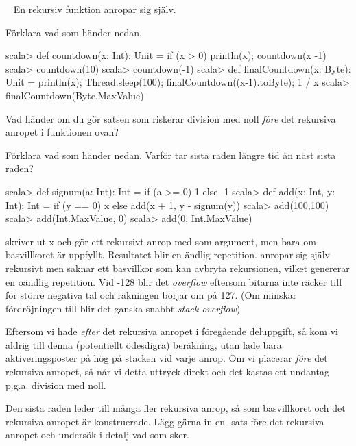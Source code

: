 \QUESTEND





\QUESTBEGIN

\Task\Uberkurs  \what~  En rekursiv funktion anropar sig själv.

\Subtask Förklara vad som händer nedan.

\begin{REPL}
scala> def countdown(x: Int): Unit = if (x > 0) {println(x); countdown(x -1)}
scala> countdown(10)
scala> countdown(-1)
scala> def finalCountdown(x: Byte): Unit =
         {println(x); Thread.sleep(100); finalCountdown((x-1).toByte); 1 / x}
scala> finalCountdown(Byte.MaxValue)
\end{REPL}

\Subtask Vad händer om du gör satsen som riskerar division med noll \emph{före} det rekursiva anropet i funktionen  ovan?

\Subtask Förklara vad som händer nedan. Varför tar sista raden längre tid än näst sista raden?
\begin{REPL}
scala> def signum(a: Int): Int = if (a >= 0) 1 else -1
scala> def add(x: Int, y: Int): Int =
         if (y == 0) x else add(x + 1, y - signum(y))
scala> add(100,100)
scala> add(Int.MaxValue, 0)
scala> add(0, Int.MaxValue)
\end{REPL}

\SOLUTION

\TaskSolved \what

\SubtaskSolved
{} skriver ut x och gör ett rekursivt anrop med  som argument, men bara om basvillkoret  är uppfyllt. Resultatet blir en ändlig  repetition.
 anropar sig själv rekursivt men saknar ett basvillkor som kan avbryta rekursionen, vilket genererar en oändlig repetition. Vid -128 blir det \emph{overflow} eftersom bitarna inte räcker till för större negativa tal och räkningen börjar om på 127. (Om minskar fördröjningen till  blir det ganska snabbt \emph{stack overflow})

\SubtaskSolved
Eftersom vi hade  \emph{efter} det rekursiva anropet i föregående deluppgift, så kom vi aldrig till denna (potentiellt ödesdigra) beräkning, utan lade bara aktiveringsposter på hög på stacken vid varje anrop. Om vi placerar  \emph{före} det rekursiva anropet, så når vi detta uttryck direkt och det kastas ett undantag p.g.a. division med noll.

\SubtaskSolved
Den sista raden leder till många fler rekursiva anrop, så som basvillkoret och det rekursiva anropet är konstruerade. Lägg gärna in en -sats före det rekursiva anropet och undersök i detalj vad som sker.

